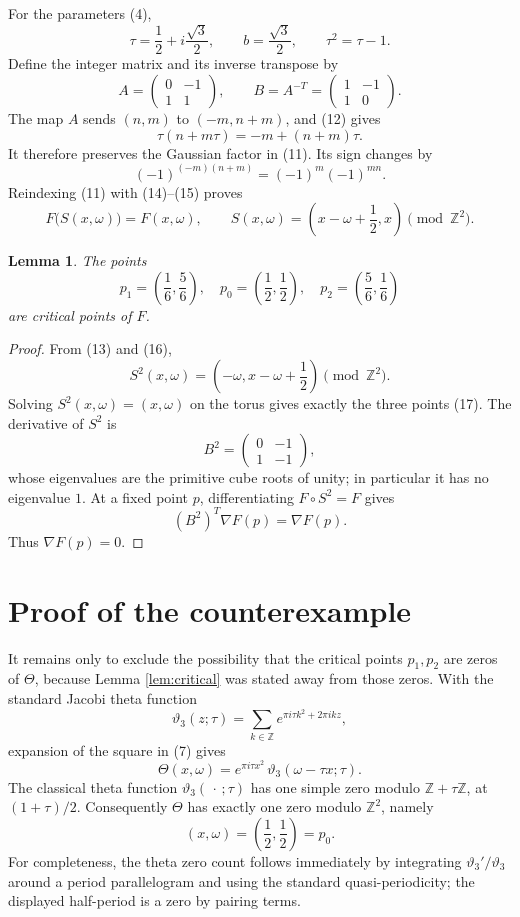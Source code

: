 \documentclass[11pt]{article}
\newtheorem{lemma}[theorem]{Lemma}
\newcommand{\Z}{\mathbb Z}
\begin{document}
For the parameters (4),
\[
 \tau=\frac12+i\frac{\sqrt3}{2},\qquad b=\frac{\sqrt3}{2},
\qquad \tau^2=\tau-1.
 \tag{12}
\]
Define the integer matrix and its inverse transpose by
\[
 A=\begin{pmatrix}0&-1\\1&1\end{pmatrix},
 \qquad
 B=A^{-T}=\begin{pmatrix}1&-1\\1&0\end{pmatrix}.
 \tag{13}
\]
The map \(A\) sends \((n,m)\) to \((-m,n+m)\), and (12) gives
\[
 \tau(n+m\tau)=-m+(n+m)\tau.
 \tag{14}
\]
It therefore preserves the Gaussian factor in (11).  Its sign changes by
\[
 (-1)^{(-m)(n+m)}=(-1)^m(-1)^{mn}.
 \tag{15}
\]
Reindexing (11) with (14)--(15) proves
\[
 F\bigl(S(x,\omega)\bigr)=F(x,\omega),\qquad
 S(x,\omega)=\left(x-\omega+\frac12,x\right)\pmod{\Z^2}.
 \tag{16}
\]

\begin{lemma}\label{lem:fixed}
The points
\[
 p_1=\left(\frac16,\frac56\right),\quad
 p_0=\left(\frac12,\frac12\right),\quad
 p_2=\left(\frac56,\frac16\right)
 \tag{17}
\]
are critical points of \(F\).
\end{lemma}

\begin{proof}
From (13) and (16),
\[
 S^2(x,\omega)
 =\left(-\omega,x-\omega+\frac12\right)\pmod{\Z^2}.
 \tag{18}
\]
Solving \(S^2(x,\omega)=(x,\omega)\) on the torus gives exactly the three
points (17).  The derivative of \(S^2\) is
\[
 B^2=\begin{pmatrix}0&-1\\1&-1\end{pmatrix},
\]
whose eigenvalues are the primitive cube roots of unity; in particular it
has no eigenvalue \(1\).  At a fixed point \(p\), differentiating
\(F\circ S^2=F\) gives
\[
 (B^2)^T\nabla F(p)=\nabla F(p).
\]
Thus \(\nabla F(p)=0\).
\end{proof}

\section{Proof of the counterexample}

It remains only to exclude the possibility that the critical points
\(p_1,p_2\) are zeros of \(\Theta\), because Lemma \ref{lem:critical} was
stated away from those zeros.  With the standard Jacobi theta function
\[
 \vartheta_3(z;\tau)
 =\sum_{k\in\Z}e^{\pi i\tau k^2+2\pi i k z},
\]
expansion of the square in (7) gives
\[
 \Theta(x,\omega)
 =e^{\pi i\tau x^2}\,
   \vartheta_3(\omega-\tau x;\tau).
 \tag{19}
\]
The classical theta function \(\vartheta_3(\,\cdot\,;\tau)\) has one simple
zero modulo \(\Z+\tau\Z\), at \((1+\tau)/2\).  Consequently \(\Theta\) has
exactly one zero modulo \(\Z^2\), namely
\[
 (x,\omega)=\left(\frac12,\frac12\right)=p_0.
 \tag{20}
\]
For completeness, the theta zero count follows immediately by integrating
\(\vartheta_3'/\vartheta_3\) around a period parallelogram and using the
standard quasi-periodicity; the displayed half-period is a zero by pairing
terms.
\end{document}
